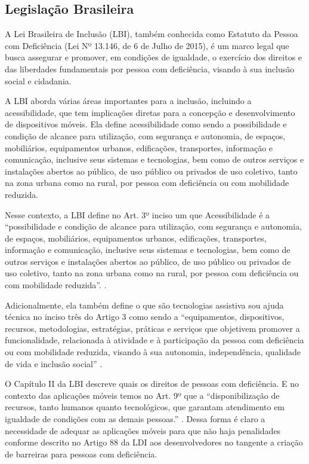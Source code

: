 \subsection{Legislação Brasileira}

A Lei Brasileira de Inclusão (LBI), também conhecida como Estatuto da Pessoa com Deficiência (Lei Nº 13.146, de 6 de Julho de 2015), é um marco legal que busca assegurar e promover, em condições de igualdade, o exercício dos direitos e das liberdades fundamentais por pessoa com deficiência, visando à sua inclusão social e cidadania.

A LBI aborda várias áreas importantes para a inclusão, incluindo a acessibilidade, que tem implicações diretas para a concepção e desenvolvimento de dispositivos móveis. Ela define acessibilidade como sendo a possibilidade e condição de alcance para utilização, com segurança e autonomia, de espaços, mobiliários, equipamentos urbanos, edificações, transportes, informação e comunicação, inclusive seus sistemas e tecnologias, bem como de outros serviços e instalações abertos ao público, de uso público ou privados de uso coletivo, tanto na zona urbana como na rural, por pessoa com deficiência ou com mobilidade reduzida.

Nesse contexto, a LBI define no Art. 3º inciso um que Acessibilidade é a “possibilidade e condição de alcance para utilização, com segurança e autonomia, de espaços, mobiliários, equipamentos urbanos, edificações, transportes, informação e comunicação, inclusive seus sistemas e tecnologias, bem como de outros serviços e instalações abertos ao público, de uso público ou privados de uso coletivo, tanto na zona urbana como na rural, por pessoa com deficiência ou com mobilidade reduzida”. \cite{lei13146}.

Adicionalmente, ela também define o que são tecnologias assistiva sou ajuda técnica no inciso três do Artigo 3 como sendo a “equipamentos, dispositivos, recursos, metodologias, estratégias, práticas e serviços que objetivem promover a funcionalidade, relacionada à atividade e à participação da pessoa com deficiência ou com mobilidade reduzida, visando à sua autonomia, independência, qualidade de vida e inclusão social” \cite{lei13146}.

O Capítulo II da LBI descreve quais os direitos de pessoas com deficiência. E no contexto das aplicações móveis temos no Art. 9º que a “disponibilização de recursos, tanto humanos quanto tecnológicos, que garantam atendimento em igualdade de condições com as demais pessoas.” \cite{lei13146}. Dessa forma é claro a necessidade de adequar as aplicações móveis para que não haja penalidades conforme descrito no Artigo 88 da LDI aos desenvolvedores no tangente a criação de barreiras para pessoas com deficiência.

